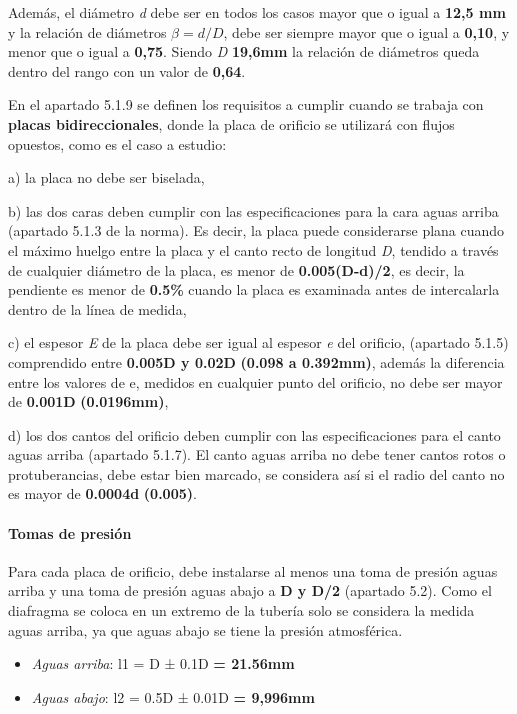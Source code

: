 Además, el diámetro \emph{d} debe ser en todos los casos mayor que o
igual a \textbf{12,5 mm} y la relación de diámetros \(\beta =d/D\), debe
ser siempre mayor que o igual a \textbf{0,10}, y menor que o igual a
\textbf{0,75}. Siendo \emph{D} \textbf{19,6mm} la relación de diámetros
queda dentro del rango con un valor de \textbf{0,64}.

En el apartado 5.1.9 se definen los requisitos a cumplir cuando se
trabaja con \textbf{placas bidireccionales}, donde la placa de orificio
se utilizará con flujos opuestos, como es el caso a estudio:

 a) la placa no debe ser biselada,

 b) las dos caras deben cumplir con las especificaciones para la cara
aguas arriba (apartado 5.1.3 de la norma). Es decir, la placa puede
considerarse plana cuando el máximo huelgo entre la placa y el canto
recto de longitud \emph{D}, tendido a través de cualquier diámetro de la
placa, es menor de \textbf{0.005(D-d)/2}, es decir, la pendiente es
menor de \textbf{0.5\%} cuando la placa es examinada antes de
intercalarla dentro de la línea de medida,

 c) el espesor \emph{E} de la placa debe ser igual al espesor \emph{e}
del orificio, (apartado 5.1.5) comprendido entre \textbf{0.005D y 0.02D}
\textbf{(0.098 a 0.392mm)}, además la diferencia entre los valores de e,
medidos en cualquier punto del orificio, no debe ser mayor de
\textbf{0.001D} \textbf{(0.0196mm)},

 d) los dos cantos del orificio deben cumplir con las especificaciones
para el canto aguas arriba (apartado 5.1.7). El canto aguas arriba no
debe tener cantos rotos o protuberancias, debe estar bien marcado, se
considera así si el radio del canto no es mayor de \textbf{0.0004d}
\textbf{(0.005)}.

\paragraph{Tomas de presión}\label{header-n293}

Para cada placa de orificio, debe instalarse al menos una toma de
presión aguas arriba y una toma de presión aguas abajo a \textbf{D y
D/2} (apartado 5.2). Como el diafragma se coloca en un extremo de la
tubería solo se considera la medida aguas arriba, ya que aguas abajo se
tiene la presión atmosférica.

\begin{itemize}
\item
  \emph{Aguas arriba}: l1 = D ± 0.1D \textbf{= \textbf{21.56mm}}
\item
  \emph{Aguas abajo}: l2 = 0.5D ± 0.01D \textbf{= 9,996mm}
\end{itemize}

